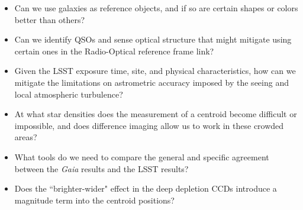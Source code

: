\begin{itemize}
\item Can we use galaxies as reference objects, and if so are certain
shapes or colors better than others?
\item Can we identify QSOs and sense optical structure that might
mitigate using certain ones in the Radio-Optical reference frame link?
\item Given the LSST exposure time, site, and physical characteristics,
how can we mitigate the limitations on astrometric accuracy imposed
by the seeing and local atmospheric turbulence?
\item At what star densities does the measurement of a centroid become
difficult or impossible, and does difference imaging allow us to work
in these crowded areas?
\item What tools do we need to compare the general and specific agreement
between the {\it Gaia} results and the LSST results?
\item Does the ``brighter-wider" effect in the deep depletion CCDs introduce
a magnitude term into the centroid positions?
\end{itemize}

\navigationbar

